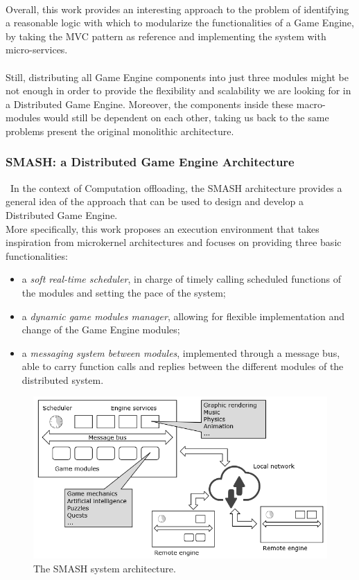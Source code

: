 \\ Overall, this work provides an interesting approach to the problem of identifying a reasonable logic with which to modularize the functionalities of a Game Engine, by taking the MVC pattern as reference and implementing the system with micro-services. \\ \\
Still, distributing all Game Engine components into just three modules might be not enough in order to provide the flexibility and scalability we are looking for in a Distributed Game Engine. Moreover, the components inside these macro-modules would still be dependent on each other, taking us back to the same problems present the original monolithic architecture.

\subsubsection{SMASH: a Distributed Game Engine Architecture \cite{womak:smash-distributed-game-engine}}\
In the context of Computation offloading, the SMASH architecture provides a general idea of the approach that can be used to design and develop a Distributed Game Engine. \\
More specifically, this work proposes an execution environment that takes inspiration from microkernel architectures and focuses on providing three basic functionalities:
\begin{itemize}
	\item a \textit{soft real-time scheduler}, in charge of timely calling scheduled functions of the modules and setting the pace of the system;
	\item a \textit{dynamic game modules manager}, allowing for flexible implementation and change of the Game Engine modules;
	\item a \textit{messaging system between modules}, implemented through a message bus, able to carry function calls and replies between the different modules of the distributed system.
\end{itemize}
\begin{figure}[h!]
	\centering
	\includegraphics[width=0.9\linewidth]{"immagini/State-of-the-art/SMASH architecture"}
	\caption[The SMASH system architecture.]{The SMASH system architecture.}
	\label{fig:smash-architecture}
\end{figure}
